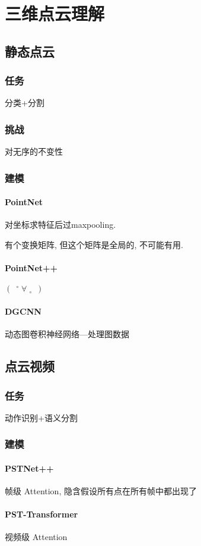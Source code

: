 \newpage
\section{三维点云理解}
\subsection{静态点云}
\subsubsection{任务}
分类+分割
\subsubsection{挑战}
对无序的不变性

\subsubsection{建模}
\paragraph{PointNet}
对坐标求特征后过maxpooling. 

有个变换矩阵, 但这个矩阵是全局的, 不可能有用. 

\paragraph{PointNet++}
$\left(\enspace{}^{\circ}\;\forall\;{}_{\circ}\enspace\right)$

\paragraph{DGCNN} 动态图卷积神经网络—处理图数据

\subsection{点云视频}
\subsubsection{任务}
动作识别+语义分割
\subsubsection{建模}
\paragraph{PSTNet++}
帧级 Attention, 隐含假设所有点在所有帧中都出现了

\paragraph{PST-Transformer}
视频级 Attention
